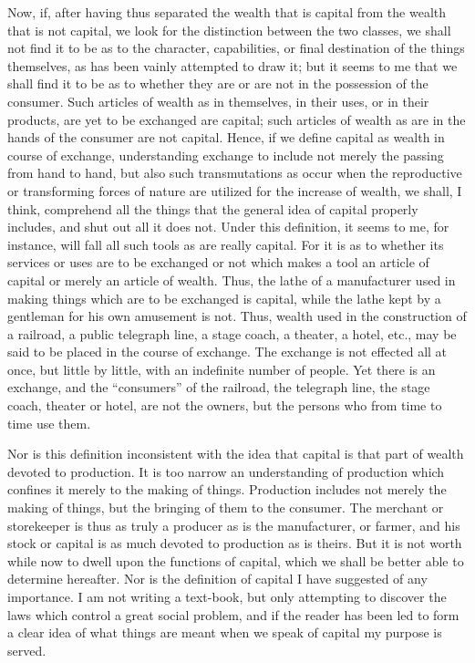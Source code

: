 Now, if, after having thus separated the wealth that is capital from the
wealth that is not capital, we look for the distinction between the two
classes, we shall not find it to be as to the character, capabilities,
or final destination of the things themselves, as has been vainly
attempted to draw it; but it seems to me that we shall find it to be as
to whether they are or are not in the possession of the consumer. Such
articles of wealth as in themselves, in their uses, or in their
products, are yet to be exchanged are capital; such articles of wealth
as are in the hands of the consumer are not capital. Hence, if we define
capital as wealth in course of exchange, understanding exchange to
include not merely the passing from hand to hand, but also such
transmutations as occur when the reproductive or transforming forces of
nature are utilized for the increase of wealth, we shall, I think,
comprehend all the things that the general idea of capital properly
includes, and shut out all it does not. Under this definition, it seems
to me, for instance, will fall all such tools as are really capital. For
it is as to whether its services or uses are to be exchanged or not
which makes a tool an article of capital or merely an article of wealth.
Thus, the lathe of a manufacturer used in making things which are to be
exchanged is capital, while the lathe kept by a gentleman for his own
amusement is not. Thus, wealth used in the construction of a railroad, a
public telegraph line, a stage coach, a theater, a hotel, etc., may be
said to be placed in the course of exchange. The exchange is not
effected all at once, but little by little, with an indefinite number of
people. Yet there is an exchange, and the ``consumers'' of the railroad,
the telegraph line, the stage coach, theater or hotel, are not the
owners, but the persons who from time to time use them.

Nor is this definition inconsistent with the idea that capital is that
part of wealth devoted to production. It is too narrow an understanding
of production which confines it merely to the making of things.
Production includes not merely the making of things, but the bringing of
them to the consumer. The merchant or storekeeper is thus as truly a
producer as is the manufacturer, or farmer, and his stock or capital is
as much devoted to production as is theirs. But it is not worth while
now to dwell upon the functions of capital, which we shall be better
able to determine hereafter. Nor is the definition of capital I have
suggested of any importance. I am not writing a text-book, but only
attempting to discover the laws which control a great social problem,
and if the reader has been led to form a clear idea of what things are
meant when we speak of capital my purpose is served.

